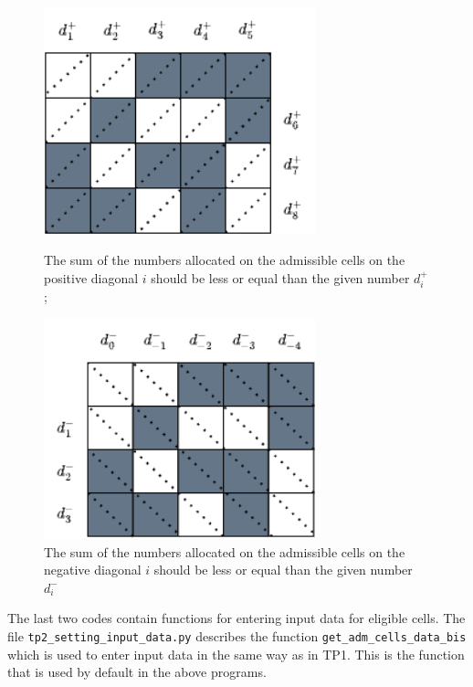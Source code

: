 \documentclass[a4paper, 12pt]{article}
\begin{document}
\begin{figure}[H]
  \begin{center}
    \begin{minipage}{0.5\textwidth}
      \centering
      \includegraphics[width=0.7\textwidth]{./img/pos_diagonal_adm_cells.png}
      \caption{The sum of the numbers allocated on the admissible cells on the positive diagonal \(i\) should be less or equal than the given number \(d^+_i\);}\label{fig:posdiagonal}
    \end{minipage}
    \hfill
    \begin{minipage}{0.48\textwidth}
      \centering
      \includegraphics[width=0.7\textwidth]{./img/neg_diagonal_adm_cells.png}
      \caption{The sum of the numbers allocated on the admissible cells on the negative diagonal \(i\) should be less or equal than the given number \(d^-_i\)}\label{fig:negdiagonal}
    \end{minipage}
  \end{center}
\end{figure}


The last two codes contain functions for entering input data for eligible cells. 
The file 
 \texttt{tp2\_setting\_input\_data.py} describes the function \texttt{get\_adm\_cells\_data\_bis} which is used to enter input data in the same way as in TP1. This is the function that is used by default in the above programs. 
\end{document}
